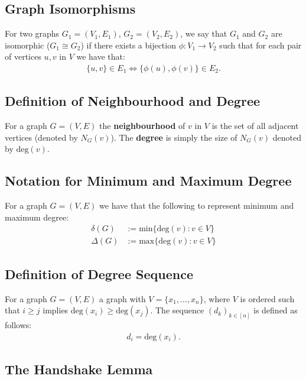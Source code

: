 \documentclass[a4paper, 12pt, twoside]{article}
\begin{document}
\subsection{Graph Isomorphisms}

For two graphs $G_1 = (V_1, E_1)$, $G_2 = (V_2, E_2)$, we say that
$G_1$ and $G_2$ are isomorphic ($G_1 \cong G_2$) if there exists a
bijection $\phi : V_1 \to V_2$ such that for each pair of vertices
$u, v$ in $V$ we have that: \begin{gather*}
  \{u, v\} \in E_1 \Longleftrightarrow \{\phi(u), \phi(v)\} \in E_2.
\end{gather*}

\subsection{Definition of Neighbourhood and Degree}

For a graph $G = (V, E)$ the \textbf{neighbourhood} of $v$ in $V$ 
is the set of all adjacent vertices (denoted by $N_G(v)$). 
The \textbf{degree} is simply the size of $N_G(v)$ denoted 
by $\text{deg}(v)$.

\subsection{Notation for Minimum and Maximum Degree}

For a graph $G = (V, E)$ we have that the following to represent
minimum and maximum degree: \begin{align*}
  \delta(G) &:= \text{min}\{\text{deg}(v) : v \in V\} \\
  \Delta(G) &:= \text{max}\{\text{deg}(v) : v \in V\}
\end{align*}

\subsection{Definition of Degree Sequence}

For a graph $G = (V, E)$ a graph with $V = \{x_1, \ldots, x_n\}$,
where $V$ is ordered such that $i \geq j$ implies $\text{deg}(x_i)
\geq \text{deg}(x_j)$. The sequence $(d_k)_{k \in [n]}$ is defined
as follows: \begin{gather*}
  d_i = \text{deg}(x_i).
\end{gather*} 

\subsection{The Handshake Lemma}
\end{document}
